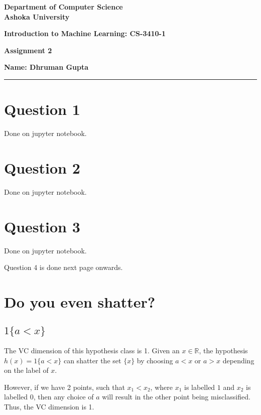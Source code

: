 \documentclass[a4paper]{article}
\begin{document}
\begin{center}
{\large \bf \color{red}  Department of Computer Science} \\
{\large \bf \color{red}  Ashoka University} \\

\vspace{0.1in}

{\large \bf \color{blue} Introduction to Machine Learning: CS-3410-1}

\vspace{0.05in}

    { \bf \color{YellowOrange} Assignment 2}
\end{center}
\medskip

{\textbf{Name: Dhruman Gupta} }

\bigskip
\hrule

\section{Question 1}
Done on jupyter notebook.

\section{Question 2}
Done on jupyter notebook.

\section{Question 3}
Done on jupyter notebook.

Question 4 is done next page onwards.

\newpage

\section{Do you even shatter?}

\subsection{$1\{a < x\}$}

The VC dimension of this hypothesis class is 1. Given an $x \in \mathbb{R}$, the hypothesis $h(x) = 1\{a < x\}$ can shatter the set $\{x\}$ by choosing $a < x$ or $a > x$ depending on the label of $x$.

However, if we have 2 points, such that $x_1 < x_2$, where $x_1$ is labelled $1$ and $x_2$ is labelled $0$, then any choice of $a$ will result in the other point being misclassified. Thus, the VC dimension is 1.
\end{document}

